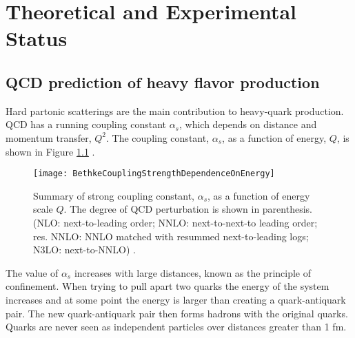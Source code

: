 \chapter{Theoretical and Experimental Status} \label{ch:Experimental and Theoretical Status}

\section{QCD prediction of heavy flavor production}




Hard partonic scatterings are the main contribution to heavy-quark production. QCD has a running coupling constant $\alpha_{s}$, which depends on distance and momentum transfer, $Q^2$.  The coupling constant, $\alpha_{s}$, as a function of energy, $Q$, is shown in Figure \ref{fig:BethkeCouplingStrengthDependenceOnEnergy} \cite{Bethke:2012jm}. 

\begin{figure}[h!]
  \centering
  \texttt{[image: BethkeCouplingStrengthDependenceOnEnergy]}\\
  \caption{Summary of strong coupling constant, $\alpha_{s}$, as a function of energy scale $Q$. The degree of QCD perturbation is shown in parenthesis. (NLO: next-to-leading order; NNLO: next-to-next-to leading order; res. NNLO: NNLO matched with resummed next-to-leading logs; N3LO: next-to-NNLO) \cite{Bethke:2012jm}.} \label{fig:BethkeCouplingStrengthDependenceOnEnergy}
\end{figure}

The value of $\alpha_{s}$ increases with large distances, known as the principle of confinement. When trying to pull apart two quarks the energy of the system increases and at some point the energy is larger than creating a quark-antiquark pair. The new quark-antiquark pair then forms hadrons with the original quarks. Quarks are never seen as independent particles over distances greater than 1 fm. 

